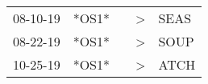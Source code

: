 \begin{supertabular}{lllll}
 08-10-19 &  *OS1* &   &  \textgreater &  SEAS \\
 08-22-19 &  *OS1* &   &  \textgreater &  SOUP \\
 10-25-19 &  *OS1* &   &  \textgreater &  ATCH \\
\end{supertabular}
